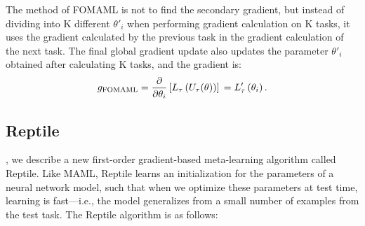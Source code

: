 The method of FOMAML is not to find the secondary gradient, but instead of dividing into K different $\theta'_i$ when performing gradient calculation on K tasks, it uses the gradient calculated by the previous task in the gradient calculation of the next task. The final global gradient update also updates the parameter $\theta'_i$ obtained after calculating K tasks, and the gradient is:
$$
  g_{\mathrm{FOMAML}} =\frac{\partial}{\partial \theta_{i}}\left[L_{\tau}\left(U_{\tau}(\theta)\right)\right] \\
  =L_{\tau}^{\prime}\left(\theta_{i}\right).
$$


\subsection{Reptile}
, we describe a new first-order gradient-based meta-learning algorithm called Reptile.
Like MAML, Reptile learns an initialization for the parameters of a neural network model, such
that when we optimize these parameters at test time, learning is fast—i.e., the model generalizes
from a small number of examples from the test task. The Reptile algorithm is as follows: